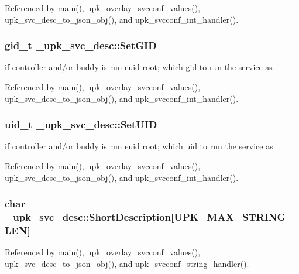 Referenced by main(), upk\_\-overlay\_\-svcconf\_\-values(), upk\_\-svc\_\-desc\_\-to\_\-json\_\-obj(), and upk\_\-svcconf\_\-int\_\-handler().

\subsubsection[{SetGID}]{\setlength{\rightskip}{0pt plus 5cm}gid\_\-t {\bf \_\-upk\_\-svc\_\-desc::SetGID}}\label{struct__upk__svc__desc_a7887cae5324acc83464be8abac504f94}
if controller and/or buddy is run euid root; which gid to run the service as 

Referenced by main(), upk\_\-overlay\_\-svcconf\_\-values(), upk\_\-svc\_\-desc\_\-to\_\-json\_\-obj(), and upk\_\-svcconf\_\-int\_\-handler().

\subsubsection[{SetUID}]{\setlength{\rightskip}{0pt plus 5cm}uid\_\-t {\bf \_\-upk\_\-svc\_\-desc::SetUID}}\label{struct__upk__svc__desc_ace144bc7dcf20f17774b1d106e16ab21}
if controller and/or buddy is run euid root; which uid to run the service as 

Referenced by main(), upk\_\-overlay\_\-svcconf\_\-values(), upk\_\-svc\_\-desc\_\-to\_\-json\_\-obj(), and upk\_\-svcconf\_\-int\_\-handler().

\subsubsection[{ShortDescription}]{\setlength{\rightskip}{0pt plus 5cm}char {\bf \_\-upk\_\-svc\_\-desc::ShortDescription}[UPK\_\-MAX\_\-STRING\_\-LEN]}\label{struct__upk__svc__desc_aca08055b4360de3e87e49efa82437086}


Referenced by main(), upk\_\-overlay\_\-svcconf\_\-values(), upk\_\-svc\_\-desc\_\-to\_\-json\_\-obj(), and upk\_\-svcconf\_\-string\_\-handler().

